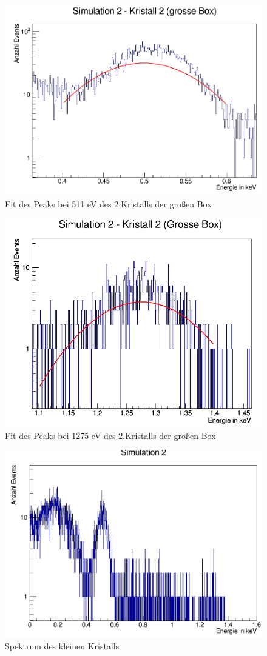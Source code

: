 \documentclass[a4paper,14pt,twoside]{article}
\begin{document}
\begin{figure}[H]
	\begin{center}
		\includegraphics[width=0.7\linewidth]{Simulation2(2KGB)_511_fitt}
		\caption{Fit des Peaks bei 511 eV des 2.Kristalls der großen Box}
		\label{}
	\end{center}
\end{figure}

\begin{figure}[H]
	\begin{center}
		\includegraphics[width=0.7\linewidth]{Simulation2(2KGB)_1275_fitt}
		\caption{Fit des Peaks bei 1275 eV des 2.Kristalls der großen Box}
		\label{}
	\end{center}
\end{figure}

\begin{figure}[H]
	\begin{center}
		\includegraphics[width=0.7\linewidth]{Simulation2_ganz}
		\caption{Spektrum des kleinen Kristalls}
		\label{S2_KB_ganz}
	\end{center}
\end{figure}
\end{document}
